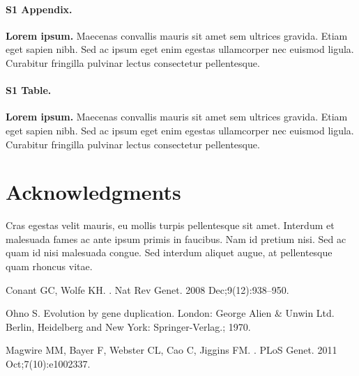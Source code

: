 \documentclass[10pt,letterpaper]{article}
\begin{document}
\paragraph*{S1 Appendix.}
\label{S1_Appendix}
{\bf Lorem ipsum.} Maecenas convallis mauris sit amet sem ultrices gravida. Etiam eget sapien nibh. Sed ac ipsum eget enim egestas ullamcorper nec euismod ligula. Curabitur fringilla pulvinar lectus consectetur pellentesque.

\paragraph*{S1 Table.}
\label{S1_Table}
{\bf Lorem ipsum.} Maecenas convallis mauris sit amet sem ultrices gravida. Etiam eget sapien nibh. Sed ac ipsum eget enim egestas ullamcorper nec euismod ligula. Curabitur fringilla pulvinar lectus consectetur pellentesque.

\section*{Acknowledgments}
Cras egestas velit mauris, eu mollis turpis pellentesque sit amet. Interdum et malesuada fames ac ante ipsum primis in faucibus. Nam id pretium nisi. Sed ac quam id nisi malesuada congue. Sed interdum aliquet augue, at pellentesque quam rhoncus vitae.

\nolinenumbers

%
%
% 
\begin{thebibliography}{10}

Conant GC, Wolfe KH.
.
\newblock Nat Rev Genet. 2008 Dec;9(12):938--950.

Ohno S.
\newblock Evolution by gene duplication.
\newblock London: George Alien \& Unwin Ltd. Berlin, Heidelberg and New York:
  Springer-Verlag.; 1970.

Magwire MM, Bayer F, Webster CL, Cao C, Jiggins FM.
.
\newblock PLoS Genet. 2011 Oct;7(10):e1002337.

\end{thebibliography}
\end{document}
